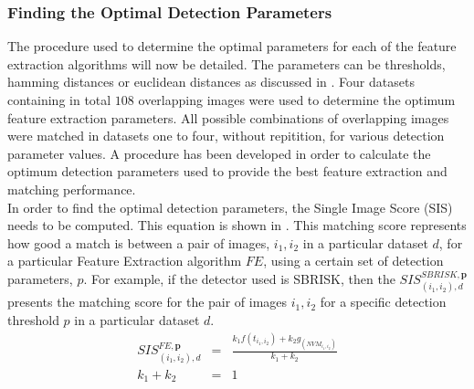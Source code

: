 \documentclass{article}
\begin{document}
\subsubsection{Finding the Optimal Detection Parameters}
\label{sec:optimalParameters}
The procedure used to determine the optimal parameters for each of the feature extraction algorithms will now be detailed. The parameters can be thresholds, hamming distances or euclidean distances as discussed in . Four datasets containing in total $108$ overlapping images were used to determine the optimum feature extraction parameters. All possible combinations of overlapping images were matched in datasets  one to four, without repitition, for various detection parameter values. A procedure has been developed in order to calculate the optimum detection parameters used to provide the best feature extraction and matching performance.\\
In order to find the optimal detection parameters, the Single Image Score (SIS) needs to be computed. This equation is shown in . This matching score represents how good a match is between a pair of images, $i_1, i_2$ in a particular dataset $d$, for a particular Feature Extraction algorithm $FE$, using a certain set of detection parameters, $p$. For example, if the detector used is SBRISK, then the $SIS_{(i_1, i_2), d}^{SBRISK, \textbf{p}}$ presents the matching score for the pair of images $i_1, i_2$ for a specific detection threshold $p$ in a particular dataset $d$. \\

\begin{eqnarray}
SIS_{(i_1, i_2), d}^{FE, \textbf{p}} &=& \frac{k_1 f(t_{i_1,i_2}) + k_2 g_(\textit{NVM}_{i_1,i_2})}{k_1 + k_2} \\
k_1 + k_2 &=& 1  
\label{eqn:optimalParameters}
\end{eqnarray}
\end{document}

